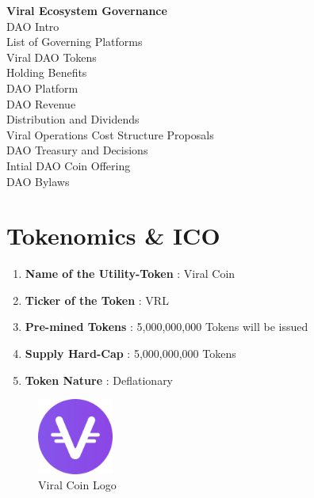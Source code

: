 \documentclass[10pt]{article}
\begin{document}
\textbf{Viral Ecosystem Governance}\\



DAO Intro\\
List of Governing Platforms\\
Viral DAO Tokens\\
Holding Benefits\\
DAO Platform\\
DAO Revenue\\
Distribution and Dividends\\
Viral Operations Cost Structure Proposals\\
DAO Treasury and Decisions\\
Intial DAO Coin Offering\\
DAO Bylaws\\

\newpage

\section{Tokenomics \& ICO}

\vspace{5mm}

\begin{multicols}{2}

\begin{enumerate}[leftmargin=+0.2in]
\item \textbf{Name of the Utility-Token} : Viral Coin
\item \textbf{Ticker of the Token} : VRL
\item \textbf{Pre-mined Tokens} : 5,000,000,000 Tokens will be issued 
\item \textbf{Supply Hard-Cap} : 5,000,000,000 Tokens
\item \textbf{Token Nature} : Deflationary
\end{enumerate}

\begin{figure}[H]
\begin{center}
\includegraphics[width=2.5cm]{viral-coin-logo}
\caption{Viral Coin Logo}
\end{center}
\end{figure}
\end{multicols}
\end{document}
